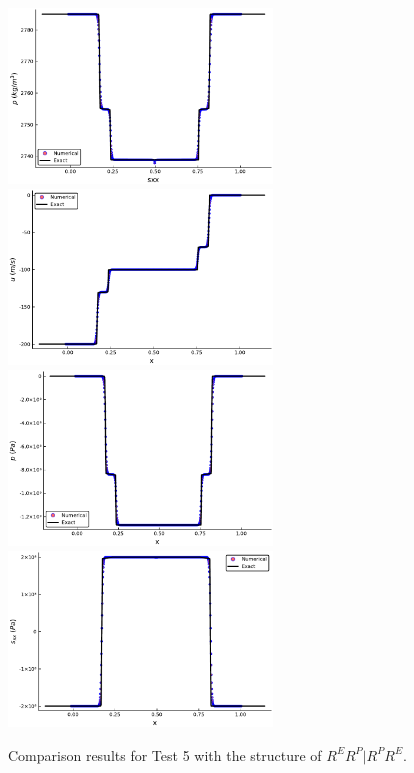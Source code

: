 \documentclass[review]{elsarticle}
\numberwithin{equation}{section}
\numberwithin{table}{section}
\begin{document}
\begin{figure}[ht]
  \centering
 \includegraphics[width= 7cm] {case20rho.pdf}
  \includegraphics[width= 7cm] {case20u.pdf}
  \includegraphics[width= 7cm] {case20p.pdf}
  \includegraphics[width= 7cm] {case20sxx.pdf}
    \caption{Comparison results for Test 5 with the structure of $R^ER^P|R^PR^E$.  }
  \label{fig:case20}
\end{figure}
\end{document}
